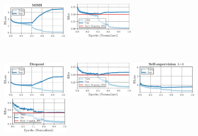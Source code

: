 \begin{figure}[t]
\begin{minipage}[t]{0.19\textwidth}
		\includegraphics[height=1.8cm]{plots_supp_training_curves_mish_loss}
		
		\hspace*{-0.25cm}
		\includegraphics[height=1.8cm]{plots_supp_training_curves_mish_error}
	\end{minipage}
	\\[2.5px]
	
	\begin{minipage}[t]{0.19\textwidth}
		\vspace*{0px}
		
		\includegraphics[height=1.8cm]{plots_supp_training_curves_dropout_loss}
		
		\hspace*{-0.15cm}
		\includegraphics[height=1.8cm]{plots_supp_training_curves_dropout_error}
	\end{minipage}
	\begin{minipage}[t]{0.19\textwidth}
		\vspace*{0px}
		
		\includegraphics[height=1.8cm]{plots_supp_training_curves_ssl4_loss}
		
		\hspace*{-0.25cm}
		\includegraphics[height=1.8cm]{plots_supp_training_curves_ssl4_error}
	\end{minipage}
	\begin{minipage}[t]{0.19\textwidth}
		\vspace*{0px}
		

\end{minipage}
\end{figure}

